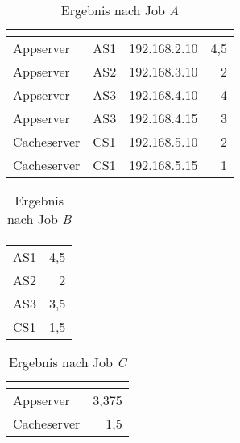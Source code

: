 \begin{table}[h]
	\centering
	\begin{tabular}{| l | l | l | r |}
		\hline
		\rowcolor[HTML]{3531FF} 
		\multicolumn{1}{l|}{\cellcolor[HTML]{4F88BB}{\color[HTML]{FFFFFF} {\bf Serverart}}} & \multicolumn{1}{l|}{\cellcolor[HTML]{4F88BB}{\color[HTML]{FFFFFF} {\bf Gruppe}}} & \multicolumn{1}{l|}{\cellcolor[HTML]{4F88BB}{\color[HTML]{FFFFFF} {\bf IP-Adresse}}} & \multicolumn{1}{l|}{\cellcolor[HTML]{4F88BB}{\color[HTML]{FFFFFF} {\bf Antwortzeit (in Sekunden)}}} \\ \hline
		Appserver & AS1 & 192.168.2.10 & 4,5 \\ \hline
		Appserver & AS2 & 192.168.3.10 & 2 \\ \hline
		Appserver & AS3 & 192.168.4.10 & 4 \\ \hline
		Appserver & AS3 & 192.168.4.15 & 3 \\ \hline
		Cacheserver & CS1 & 192.168.5.10 & 2 \\ \hline
		Cacheserver & CS1 & 192.168.5.15 & 1 \\ \hline
	\end{tabular}
	\caption{Ergebnis nach Job \textit{A}}
	\label{tbl:BeispieldatenCSVLog_02}
\end{table}

\begin{table}[h]
	\centering
	\begin{tabular}{| l | r |}
		\hline
		\rowcolor[HTML]{3531FF} \multicolumn{1}{l|}{\cellcolor[HTML]{4F88BB}{\color[HTML]{FFFFFF} {\bf Gruppe}}} & \multicolumn{1}{l|}{\cellcolor[HTML]{4F88BB}{\color[HTML]{FFFFFF} {\bf Antwortzeit (in Sekunden)}}} \\ \hline
		AS1 & 4,5 \\ \hline
		AS2 & 2 \\ \hline
		AS3 & 3,5 \\ \hline
		CS1 & 1,5 \\ \hline
	\end{tabular}
	\caption{Ergebnis nach Job \textit{B}}
	\label{tbl:BeispieldatenCSVLog_03}
\end{table} 

\begin{table}[h]
	\centering
	\begin{tabular}{| l | r |}
		\hline
		\rowcolor[HTML]{3531FF} 
		\multicolumn{1}{l|}{\cellcolor[HTML]{4F88BB}{\color[HTML]{FFFFFF} {\bf Serverart}}} & \multicolumn{1}{l|}{\cellcolor[HTML]{4F88BB}{\color[HTML]{FFFFFF} {\bf Antwortzeit (in Sekunden)}}} \\ \hline
		Appserver & 3,375 \\ \hline
		Cacheserver & 1,5 \\ \hline
	\end{tabular}
	\caption{Ergebnis nach Job \textit{C}}
	\label{tbl:BeispieldatenCSVLog_04}
\end{table}

